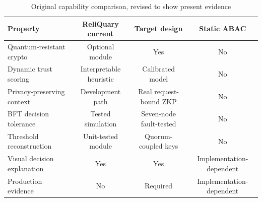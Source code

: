 \documentclass[10pt]{article}
\begin{document}
\begin{table}[H]
\centering
\caption{Original capability comparison, revised to show present evidence}
\begin{tabularx}{\textwidth}{Y c c c}
\toprule
\textbf{Property} & \textbf{ReliQuary current} & \textbf{Target design} & \textbf{Static ABAC}\\
\midrule
Quantum-resistant crypto & Optional module & Yes & No\\
Dynamic trust scoring & Interpretable heuristic & Calibrated model & No\\
Privacy-preserving context & Development path & Real request-bound ZKP & No\\
BFT decision tolerance & Tested simulation & Seven-node fault-tested & No\\
Threshold reconstruction & Unit-tested module & Quorum-coupled keys & No\\
Visual decision explanation & Yes & Yes & Implementation-dependent\\
Production evidence & No & Required & Implementation-dependent\\
\bottomrule
\end{tabularx}
\end{table}



\end{document}
